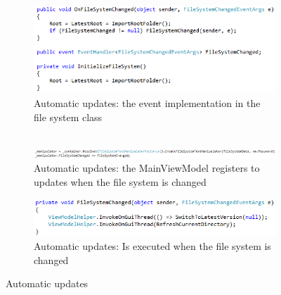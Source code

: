 \documentclass[JCDReport.tex]{subfiles}
\begin{document}
\begin{figure}[h!]
	\begin{subfigure}[b]{1\textwidth}
		\centering
		\includegraphics[scale=1]{Images/file_system_changed1.png} 
		\caption{Automatic updates: the event implementation in the file system class\\\ \\} %
	\end{subfigure}
	
	\begin{subfigure}[b]{1\textwidth}
		\centering
		\includegraphics[scale=1]{Images/file_system_changed2.png} 
		\caption{Automatic updates: the MainViewModel registers to updates when the file system is changed\\}
	\end{subfigure}
	
	\begin{subfigure}[b]{1\textwidth}
		\centering
		\includegraphics[scale=1]{Images/file_system_changed3.png} 
		\caption{Automatic updates: Is executed when the file system is changed\\}
	\end{subfigure}
	\caption{Automatic updates}
\end{figure}


\end{document}
